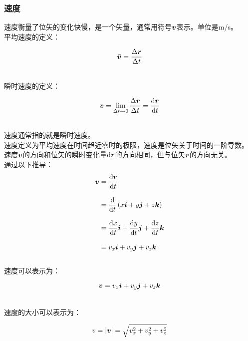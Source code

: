 \documentclass[UTF8]{ctexart}
\newcommand*{\veb}[1]{\vb*{#1}}
\newcommand*{\dif}{\mathop{}\!\mathrm{d}}
\begin{document}
\subsubsection{速度}
    速度衡量了位矢的变化快慢，是一个矢量，通常用符号$\veb{v}$表示。单位是\si{m/s}。\\[3mm]
    平均速度的定义：
    \begin{large}
        \begin{equation*}
            \bar{\veb{v}}=\frac{\Delta \veb{r}}{\Delta t}
        \end{equation*}
    \end{large}\\
    瞬时速度的定义：
    \begin{large}
        \begin{equation*}
            \veb{v}=\lim_{\Delta t\rightarrow 0}\frac{\Delta \veb{r}}{\Delta t}=\frac{\dif\veb{r}}{\dif t}
        \end{equation*}
    \end{large}\\
    速度通常指的就是瞬时速度。\\[3mm]
    速度定义为平均速度在时间趋近零时的极限，速度是位矢关于时间的一阶导数。\\[3mm]
    速度$\veb{v}$的方向和位矢的瞬时变化量$\dif\veb{r}$的方向相同，但与位矢$\veb{r}$的方向无关。\\[6mm]
    通过以下推导：
    \setcounter{equation}{0}
    \begin{align}
        \veb{v}
        &=\frac{\dif\veb{r}}{\dif t}\\[3mm]
        &=\frac{\dif}{\dif t}\left(x\veb{i}+y\veb{j}+z\veb{k}\right)\\[3mm]
        &=\frac{\dif x}{\dif t}\veb{i}+\frac{\dif y}{\dif t}\veb{j}+\frac{\dif z}{\dif t}\veb{k}\\[3mm]
        &=v_x\veb{i}+v_y\veb{j}+v_z\veb{k}
    \end{align}\\
    速度可以表示为：
    \begin{large}
        \begin{equation*}
            \veb{v}=v_x\veb{i}+v_y\veb{j}+v_z\veb{k}
        \end{equation*}
    \end{large}\\
    速度的大小可以表示为：
    \begin{large}
        \begin{equation*}
            v=|\veb{v}|=\sqrt{v_x^2+v_y^2+v_z^2}
        \end{equation*}
    \end{large}\\
\end{document}
